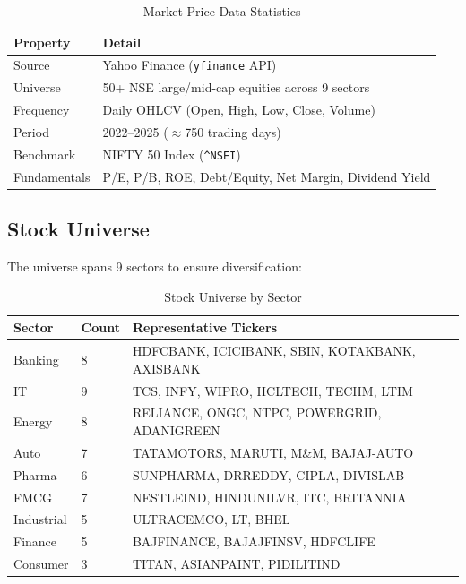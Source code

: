 \documentclass[12pt, a4paper]{article}
\begin{document}
\begin{table}[H]
\centering
\caption{Market Price Data Statistics}
\renewcommand{\arraystretch}{1.3}
\begin{tabular}{@{}ll@{}}
\toprule
\textbf{Property} & \textbf{Detail} \\ \midrule
Source       & Yahoo Finance (\texttt{yfinance} API) \\
Universe     & 50+ NSE large/mid-cap equities across 9 sectors \\
Frequency    & Daily OHLCV (Open, High, Low, Close, Volume) \\
Period       & 2022--2025 ($\approx$750 trading days) \\
Benchmark    & NIFTY 50 Index (\texttt{\^{}NSEI}) \\
Fundamentals & P/E, P/B, ROE, Debt/Equity, Net Margin, Dividend Yield \\
\bottomrule
\end{tabular}
\end{table}

\subsection{Stock Universe}

The universe spans 9 sectors to ensure diversification:

\begin{table}[H]
\centering
\caption{Stock Universe by Sector}
\renewcommand{\arraystretch}{1.2}
\small
\begin{tabular}{@{}lll@{}}
\toprule
\textbf{Sector} & \textbf{Count} & \textbf{Representative Tickers} \\ \midrule
Banking     & 8  & HDFCBANK, ICICIBANK, SBIN, KOTAKBANK, AXISBANK \\
IT          & 9  & TCS, INFY, WIPRO, HCLTECH, TECHM, LTIM \\
Energy      & 8  & RELIANCE, ONGC, NTPC, POWERGRID, ADANIGREEN \\
Auto        & 7  & TATAMOTORS, MARUTI, M\&M, BAJAJ-AUTO \\
Pharma      & 6  & SUNPHARMA, DRREDDY, CIPLA, DIVISLAB \\
FMCG        & 7  & NESTLEIND, HINDUNILVR, ITC, BRITANNIA \\
Industrial  & 5  & ULTRACEMCO, LT, BHEL \\
Finance     & 5  & BAJFINANCE, BAJAJFINSV, HDFCLIFE \\
Consumer    & 3  & TITAN, ASIANPAINT, PIDILITIND \\
\bottomrule
\end{tabular}
\end{table}
\end{document}
